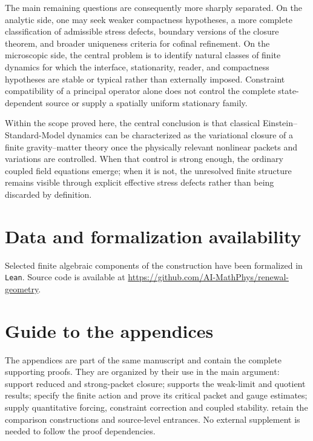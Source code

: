 \documentclass[11pt]{article}
\numberwithin{equation}{section}
\theoremstyle{definition}
\theoremstyle{remark}
\begin{document}
The main remaining questions are consequently more sharply separated.
On the analytic side, one may seek weaker compactness hypotheses, a more
complete classification of admissible stress defects, boundary versions of
the closure theorem, and broader uniqueness criteria for cofinal refinement.
On the microscopic side, the central problem is to identify natural classes
of finite dynamics for which the interface, stationarity, reader, and
compactness hypotheses are stable or typical rather than externally imposed.  Constraint
compatibility of a principal operator alone does not control the complete
state-dependent source or supply a spatially uniform stationary family.

Within the scope proved here, the central conclusion is that classical
Einstein--Standard-Model dynamics can be characterized as the variational
closure of a finite gravity--matter theory once the physically relevant
nonlinear packets and variations are controlled.  When that control is
strong enough, the ordinary coupled field equations emerge; when it is not,
the unresolved finite structure remains visible through explicit effective
stress defects rather than being discarded by definition.

\section*{Data and formalization availability}
Selected finite algebraic components of the construction have been formalized in
\texttt{Lean}.  Source code is available at
\url{https://github.com/AI-MathPhys/renewal-geometry}.

\clearpage
\appendix
{}
\section*{Guide to the appendices}

The appendices are part of the same manuscript and contain the complete
supporting proofs. They are organized by their use in the main argument:
 support reduced and
strong-packet closure;  supports the weak-limit
and quotient results; 
specify the finite action and prove its critical packet and gauge estimates;
supply quantitative forcing, constraint correction and coupled stability.
retain the comparison constructions and source-level entrances. No external
supplement is needed to follow the proof dependencies.
\end{document}
